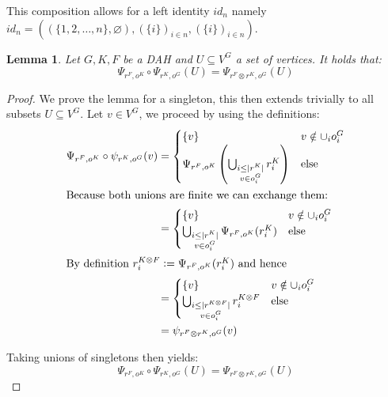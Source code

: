 \documentclass[12pt]{article}
\newtheorem{lemma}{Lemma}[section]
\theoremstyle{definition}
\newcommand{\defeq}{\vcentcolon=}
\newcommand{\1}{\mathbbm{1}}
\begin{document}
This composition allows for a left identity $id_n$ namely $id_n = ((\{1,2,\dots,n\}, \varnothing), (\{i\})_{i\in n}, (\{i\})_{i\in n})$.\vspace{5pt}

\begin{lemma}\label{lem:psieq}
    Let $G,K,F$ be a DAH and $U\subseteq V^G$ a set of vertices. It holds that:
    \[
        \Psi_{r^F, o^K}\circ \Psi_{r^K, o^G}(U) = \Psi_{r^F\otimes r^K, o^G}(U)
    \]
\end{lemma}

\begin{proof}
    We prove the lemma for a singleton, this then extends trivially to all subsets $U\subseteq V^G$. Let $v\in V^G$, we proceed by using the definitions:
    \begin{align*}
        \Psi_{r^F, o^K}\circ \psi_{r^K, o^G}(v) &= 
        \begin{cases}
            \{v\} & v\notin \cup_i o_i^G\\
            \Psi_{r^F, o^K}\left(\bigcup_{\substack{i \leq |r^K| \\ v \in o^G_i}} r^K_i\right) & \text{else}
        \end{cases}\\
        \intertext{Because both unions are finite we can exchange them: }
        &= 
        \begin{cases}
            \{v\} & v\notin \cup_i o_i^G\\
            \bigcup_{\substack{i \leq |r^K| \\ v \in o^G_i}} \Psi_{r^F, o^K} (r^K_i) & \text{else}\\
        \end{cases}\\
        \intertext{By definition $r^{K\otimes F}_i \defeq \Psi_{r^F, o^K} (r^K_i)$ and hence}
        &=
        \begin{cases}
            \{v\} & v\notin \cup_i o_i^G\\
            \bigcup_{\substack{i\leq  |r^{K\otimes F}| \\ v \in o^G_i}} r^{K\otimes F}_i & \text{else}\\
        \end{cases}\\
        &= \psi_{r^F\otimes r^K, o^G}(v)
    \end{align*}

    Taking unions of singletons then yields:
    \[
        \Psi_{r^F, o^K}\circ \Psi_{r^K, o^G}(U) = \Psi_{r^F\otimes r^K, o^G}(U)
    \]
\end{proof}
\end{document}
